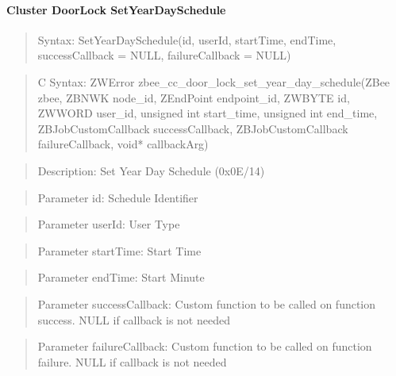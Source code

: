 \paragraph{Cluster DoorLock SetYearDaySchedule}
\begin{quote}Syntax: SetYearDaySchedule(id, userId, startTime, endTime, successCallback = NULL, failureCallback = NULL)\end{quote}
\begin{quote}C Syntax: ZWError zbee\_cc\_door\_lock\_set\_year\_day\_schedule(ZBee zbee, ZBNWK node\_id, ZEndPoint endpoint\_id, ZWBYTE id, ZWWORD user\_id, unsigned int start\_time, unsigned int end\_time, ZBJobCustomCallback successCallback, ZBJobCustomCallback failureCallback, void* callbackArg)\end{quote}
\begin{quote}Description: Set Year Day Schedule (0x0E/14)\end{quote}
\begin{quote}Parameter id: Schedule Identifier\end{quote}
\begin{quote}Parameter userId: User Type\end{quote}
\begin{quote}Parameter startTime: Start Time\end{quote}
\begin{quote}Parameter endTime: Start Minute\end{quote}
\begin{quote}Parameter successCallback: Custom function to be called on function success. NULL if callback is not needed\end{quote}
\begin{quote}Parameter failureCallback: Custom function to be called on function failure. NULL if callback is not needed\end{quote}


